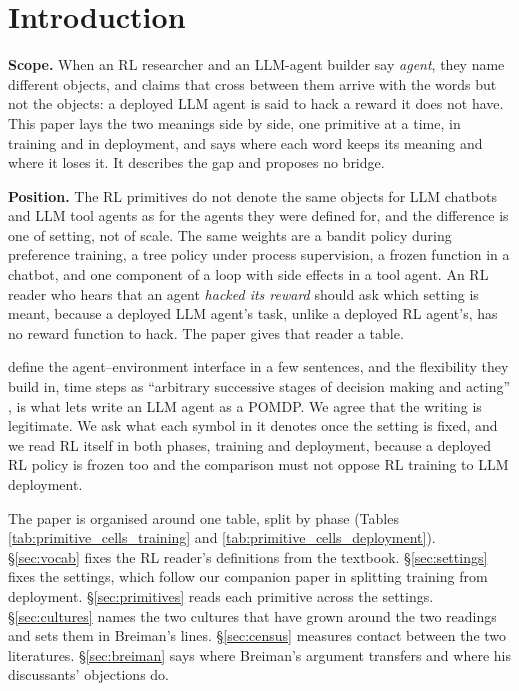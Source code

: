 \documentclass{article}
\begin{document}
\hypertarget{sec:intro}{%
\section{Introduction}\label{sec:intro}}

\textbf{Scope.} When an RL researcher and an LLM-agent builder say \emph{agent}, they name different objects, and claims that cross between them arrive with the words but not the objects: a deployed LLM agent is said to hack a reward it does not have. This paper lays the two meanings side by side, one primitive at a time, in training and in deployment, and says where each word keeps its meaning and where it loses it. It describes the gap and proposes no bridge.

\textbf{Position.} The RL primitives do not denote the same objects for LLM chatbots and LLM tool agents as for the agents they were defined for, and the difference is one of setting, not of scale. The same weights are a bandit policy during preference training, a tree policy under process supervision, a frozen function in a chatbot, and one component of a loop with side effects in a tool agent. An RL reader who hears that an agent \emph{hacked its reward} should ask which setting is meant, because a deployed LLM agent's task, unlike a deployed RL agent's, has no reward function to hack. The paper gives that reader a table.

\citet{sutton2018} define the agent--environment interface in a few sentences, and the flexibility they build in, time steps as ``arbitrary successive stages of decision making and acting'' \citep{sutton2018}, is what lets \citet{mclean2026} write an LLM agent as a POMDP. We agree that the writing is legitimate. We ask what each symbol in it denotes once the setting is fixed, and we read RL itself in both phases, training and deployment, because a deployed RL policy is frozen too and the comparison must not oppose RL training to LLM deployment.

The paper is organised around one table, split by phase (Tables \ref{tab:primitive_cells_training} and \ref{tab:primitive_cells_deployment}). §\ref{sec:vocab} fixes the RL reader's definitions from the textbook. §\ref{sec:settings} fixes the settings, which follow our companion paper \citep{debunking2026} in splitting training from deployment. §\ref{sec:primitives} reads each primitive across the settings. §\ref{sec:cultures} names the two cultures that have grown around the two readings and sets them in Breiman's lines. §\ref{sec:census} measures contact between the two literatures. §\ref{sec:breiman} says where Breiman's argument transfers and where his discussants' objections do.
\end{document}
